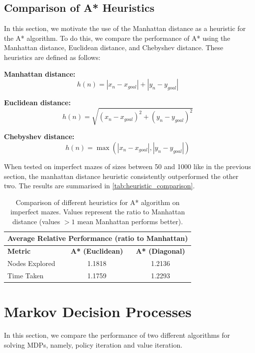 \documentclass{article}
\begin{document}
\subsection{Comparison of A* Heuristics}

In this section, we motivate the use of the Manhattan distance as a heuristic for the A* algorithm. To do this, we compare the performance of A* using the Manhattan distance, Euclidean distance, and Chebyshev distance. These heuristics are defined as follows:
\vspace{1em}

\textbf{Manhattan distance: } 
$$h(n) = |x_n - x_{goal}| + |y_n - y_{goal}|$$

\textbf{Euclidean distance: } 
$$h(n) = \sqrt{(x_n - x_{goal})^2 + (y_n - y_{goal})^2}$$

\textbf{Chebyshev distance: } 
$$h(n) = \max(|x_n - x_{goal}|, |y_n - y_{goal}|)$$

When tested on imperfect mazes of sizes between 50 and 1000 like in the previous section, the manhattan distance heuristic consistently outperformed the other two. The results are summarised in \autoref{tab:heuristic_comparison}.

\begin{table}[h]
    \centering
    \begin{tabular}{|l|c|c|}
        \hline
        \multicolumn{3}{|c|}{\textbf{Average Relative Performance (ratio to Manhattan)}} \\
        \hline
        \textbf{Metric} & \textbf{A* (Euclidean)} & \textbf{A* (Diagonal)} \\
        \hline
        Nodes Explored & 1.1818 & 1.2136 \\
        \hline
        Time Taken & 1.1759 & 1.2293 \\
        \hline
    \end{tabular}
    \caption{Comparison of different heuristics for A* algorithm on imperfect mazes. Values represent the ratio to Manhattan distance (values $> 1$ mean Manhattan performs better).}
    \label{tab:heuristic_comparison}
\end{table}

\section{Markov Decision Processes}
In this section, we compare the performance of two different algorithms for solving MDPs, namely, policy iteration and value iteration. 
\end{document}
